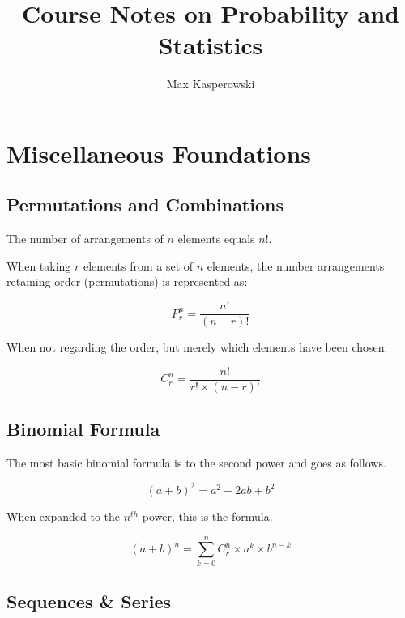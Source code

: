 \documentclass[a4paper, 10pt]{article}
\author{Max Kasperowski}
\title{Course Notes on Probability and Statistics}
\begin{document}
	\maketitle
	\tableofcontents
	\newpage

	\section{Miscellaneous Foundations}

	\subsection{Permutations and Combinations}

	The number of arrangements of \(n\) elements equals \(n!\).

	\noindent When taking \(r\) elements from a set of \(n\) elements, the number arrangements retaining order (permutations) is represented as:

	\begin{equation*}
	P^{n}_{r}=\frac{n!}{(n-r)!}
	\end{equation*}

	\noindent When not regarding the order, but merely which elements have been chosen:

	\begin{equation*}
	C^{n}_{r}=\frac{n!}{r!\times (n-r)!}
	\end{equation*}

	\subsection{Binomial Formula}

	The most basic binomial formula is to the second power and goes as follows.

	\begin{equation*}
		(a+b)^2 = a^2+2ab+b^2
	\end{equation*}

	\noindent When expanded to the \(n^{th}\) power, this is the formula.

	\begin{equation*}
		(a+b)^n = \sum_{k=0}^{n}C^{n}_{r}\times a^k\times b^{n-k}
	\end{equation*}

	\subsection{Sequences \& Series}
\end{document}
